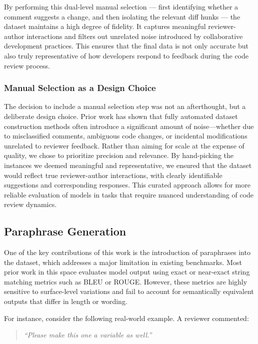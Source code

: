By performing this dual-level manual selection — first identifying whether a comment suggests a
change, and then isolating the relevant diff hunks — the dataset maintains a high degree of
fidelity. It captures meaningful reviewer-author interactions and filters out unrelated noise
introduced by collaborative development practices. This ensures that the final data is not only
accurate but also truly representative of how developers respond to feedback during the code review
process.

\subsubsection{Manual Selection as a Design Choice}

The decision to include a manual selection step was not an afterthought, but a deliberate design
choice. Prior work has shown that fully automated dataset construction methods often introduce a
significant amount of noise—whether due to misclassified comments, ambiguous code changes, or
incidental modifications unrelated to reviewer feedback. Rather than aiming for scale at the expense
of quality, we chose to prioritize precision and relevance. By hand-picking the instances we deemed
meaningful and representative, we ensured that the dataset would reflect true reviewer-author
interactions, with clearly identifiable suggestions and corresponding responses. This curated
approach allows for more reliable evaluation of models in tasks that require nuanced understanding
of code review dynamics.

\subsection{Paraphrase Generation}
\label{sec:paraphrases}

One of the key contributions of this work is the introduction of paraphrases into the dataset, which
addresses a major limitation in existing benchmarks. Most prior work in this space evaluates model
output using exact or near-exact string matching metrics such as BLEU or ROUGE. However, these
metrics are highly sensitive to surface-level variations and fail to account for semantically
equivalent outputs that differ in length or wording.

For instance, consider the following real-world example. A reviewer commented:

\begin{quote}
	\textit{“Please make this one a variable as well.”}
\end{quote}

